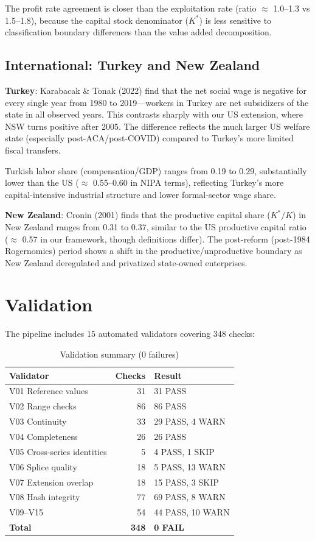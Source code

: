 \documentclass[12pt,a4paper]{article}
\begin{document}
The profit rate agreement is closer than the exploitation rate (ratio $\approx$ 1.0--1.3 vs 1.5--1.8), because the capital stock denominator ($K^*$) is less sensitive to classification boundary differences than the value added decomposition.

\subsection{International: Turkey and New Zealand}

\textbf{Turkey}: Karabacak \& Tonak (2022) find that the net social wage is negative for every single year from 1980 to 2019---workers in Turkey are net subsidizers of the state in all observed years. This contrasts sharply with our US extension, where NSW turns positive after 2005. The difference reflects the much larger US welfare state (especially post-ACA/post-COVID) compared to Turkey's more limited fiscal transfers.

Turkish labor share (compensation/GDP) ranges from 0.19 to 0.29, substantially lower than the US ($\approx$ 0.55--0.60 in NIPA terms), reflecting Turkey's more capital-intensive industrial structure and lower formal-sector wage share.

\textbf{New Zealand}: Cronin (2001) finds that the productive capital share ($K^*/K$) in New Zealand ranges from 0.31 to 0.37, similar to the US productive capital ratio ($\approx$ 0.57 in our framework, though definitions differ). The post-reform (post-1984 Rogernomics) period shows a shift in the productive/unproductive boundary as New Zealand deregulated and privatized state-owned enterprises.

\section{Validation}

The pipeline includes 15 automated validators covering 348 checks:

\begin{table}[H]
\centering
\caption{Validation summary (0 failures)}
\begin{tabular}{lrl}
\toprule
Validator & Checks & Result \\
\midrule
V01 Reference values & 31 & 31 PASS \\
V02 Range checks & 86 & 86 PASS \\
V03 Continuity & 33 & 29 PASS, 4 WARN \\
V04 Completeness & 26 & 26 PASS \\
V05 Cross-series identities & 5 & 4 PASS, 1 SKIP \\
V06 Splice quality & 18 & 5 PASS, 13 WARN \\
V07 Extension overlap & 18 & 15 PASS, 3 SKIP \\
V08 Hash integrity & 77 & 69 PASS, 8 WARN \\
V09--V15 & 54 & 44 PASS, 10 WARN \\
\midrule
\textbf{Total} & \textbf{348} & \textbf{0 FAIL} \\
\bottomrule
\end{tabular}
\end{table}
\end{document}
